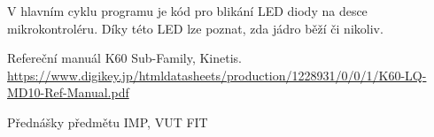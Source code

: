 \documentclass{article}
\begin{document}
V hlavním cyklu programu je kód pro blikání LED diody na desce mikrokontroléru.
Díky této LED lze poznat, zda jádro běží či nikoliv.

\newpage
\begin{thebibliography}{9}

 Refereční manuál K60 Sub-Family, Kinetis.
\url{https://www.digikey.jp/htmldatasheets/production/1228931/0/0/1/K60-LQ-MD10-Ref-Manual.pdf}

 Přednášky předmětu IMP, VUT FIT

\end{thebibliography}
\end{document}
